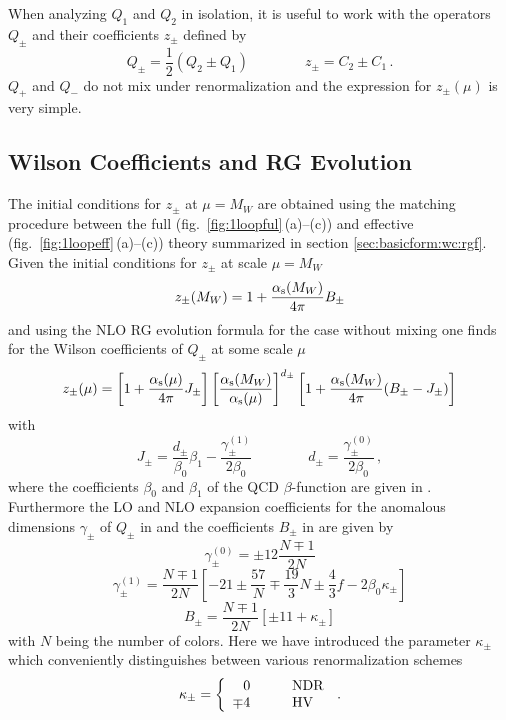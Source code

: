 When analyzing $Q_1$ and $Q_2$ in isolation, it is useful to work with
the operators $Q_{\pm}$ and their coefficients $z_{\pm}$ defined by
\begin{equation}\label{B7}
Q_{\pm}=\frac{1}{2} (Q_2\pm Q_1)
\qquad
\qquad
z_\pm=C_2\pm C_1 \, .
\end{equation}
$Q_+$ and $Q_-$ do not mix under renormalization and the expression for
$z_\pm(\mu)$ is very simple.

\subsection{Wilson Coefficients and RG Evolution}
   \label{sec:HeffdF1:22:wcrg}
The initial conditions for $z_\pm$ at $\mu=M_W$ are obtained using the
matching procedure between the full (fig.\ \ref{fig:1loopful}\,(a)--(c))
and effective (fig.\ \ref{fig:1loopeff}\,(a)--(c)) theory summarized in
section \ref{sec:basicform:wc:rgf}. Given the initial conditions for
$z_\pm$ at scale $\mu=M_W$
\begin{equation}\label{B8}
z_\pm(M_W)=1+\frac{\alpha_{\rm s}(M_W)}{4\pi}B_\pm
\end{equation}
and using the NLO RG evolution formula  for the case without
mixing one finds for the Wilson coefficients of $Q_\pm$ at some scale $\mu$
\begin{equation}\label{B9}
z_\pm(\mu)=\left[1+\frac{\alpha_{\rm s}(\mu)}{4\pi}J_\pm\right]
      \left[\frac{\alpha_{\rm s}(M_W)}{\alpha_{\rm s}(\mu)}\right]^{d_\pm}
\left[1+\frac{\alpha_{\rm s}(M_W)}{4\pi}(B_\pm-J_\pm)\right]
\end{equation}
with
\begin{equation}\label{B10}
J_\pm=\frac{d_\pm}{\beta_0}\beta_1-\frac{\gamma^{(1)}_\pm}{2\beta_0}
\qquad\qquad
d_\pm=\frac{\gamma^{(0)}_\pm}{2\beta_0} \, ,
\end{equation}
where the coefficients $\beta_0$ and $\beta_1$ of the QCD
$\beta$-function are given in . Furthermore the LO and NLO
expansion coefficients for the anomalous dimensions $\gamma_\pm$ of
$Q_\pm$ in  and the coefficients $B_\pm$ in  are given by
\begin{equation}\label{B11}
\gamma^{(0)}_\pm=\pm 12 \frac{N\mp 1}{2N}
\end{equation}
\begin{equation}\label{B12}
\gamma^{(1)}_{\pm}=\frac{N\mp 1}{2N}
\left[-21\pm\frac{57}{N}\mp\frac{19}{3}N \pm
\frac{4}{3}f-2\beta_0\kappa_\pm\right]
\end{equation}
\begin{equation}\label{B13}
B_\pm=\frac{N\mp 1}{2N}\left[\pm 11+\kappa_\pm\right]
\end{equation}
with $N$ being the number of colors.  Here we have introduced the
parameter $\kappa_\pm$ which conveniently distinguishes between various
renormalization schemes
\begin{equation}
\kappa_\pm = \left\{ \begin{array}{rl}
    0 & \qquad {\rm NDR}  \\
\mp 4 & \qquad {\rm HV}
\end{array}\right. \, .
\label{B14}
\end{equation}

